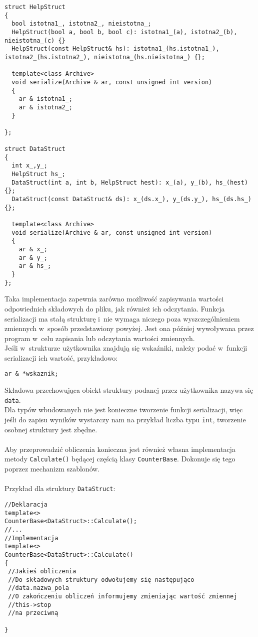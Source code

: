 \documentclass[a4paper]{article}
\begin{document}
\begin{verbatim}
struct HelpStruct
{
  bool istotna1_, istotna2_, nieistotna_;
  HelpStruct(bool a, bool b, bool c): istotna1_(a), istotna2_(b), nieistotna_(c) {}
  HelpStruct(const HelpStruct& hs): istotna1_(hs.istotna1_), istotna2_(hs.istotna2_), nieistotna_(hs.nieistotna_) {};

  template<class Archive>
  void serialize(Archive & ar, const unsigned int version)
  {
    ar & istotna1_;
    ar & istotna2_;
  }
  
};

struct DataStruct
{
  int x_,y_;
  HelpStruct hs_;
  DataStruct(int a, int b, HelpStruct hest): x_(a), y_(b), hs_(hest) {};
  DataStruct(const DataStruct& ds): x_(ds.x_), y_(ds.y_), hs_(ds.hs_) {};

  template<class Archive>
  void serialize(Archive & ar, const unsigned int version)
  {
    ar & x_;
    ar & y_;
    ar & hs_;
  }
};

\end{verbatim}
Taka implementacja zapewnia zarówno możliwość zapisywania wartości odpowiednich składowych do pliku, jak również ich odczytania.
Funkcja serializacji ma stałą strukturę i~nie wymaga niczego poza wyszczególnieniem zmiennych w~sposób przedstawiony powyżej.
Jest ona później wywoływana przez program w~celu zapisania lub odczytania wartości zmiennych.\\
Jeśli w~strukturze użytkownika znajdują się wskaźniki, należy podać w~funkcji serializacji ich wartość, przykładowo:
\begin{verbatim}
ar & *wskaznik;
\end{verbatim}
Składowa przechowująca obiekt struktury podanej przez użytkownika nazywa się \texttt{data}.\\
Dla typów wbudowanych nie jest konieczne tworzenie funkcji serializacji, więc jeśli do zapisu wyników wystarczy nam na przykład liczba typu \texttt{int}, tworzenie osobnej struktury jest zbędne.\\
~\\
Aby przeprowadzić obliczenia konieczna jest również własna implementacja metody \texttt{Calculate()} będącej częścią klasy \texttt{CounterBase}. 
Dokonuje się tego poprzez mechanizm szablonów.\\
~\\
Przykład dla struktury \texttt{DataStruct}:
\begin{verbatim}
//Deklaracja
template<>
CounterBase<DataStruct>::Calculate();
//...
//Implementacja
template<>
CounterBase<DataStruct>::Calculate()
{
 //Jakieś obliczenia
 //Do składowych struktury odwołujemy się następująco
 //data.nazwa_pola
 //O zakończeniu obliczeń informujemy zmieniając wartość zmiennej
 //this->stop
 //na przeciwną

} 
\end{verbatim}
\end{document}
